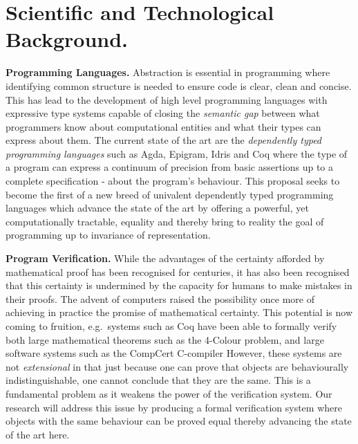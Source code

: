 \documentclass[a4paper,11pt]{article}
\newcommand{\eg}{{e.g.}\ }
\begin{document}

\vspace*{-0.1in} 
\section{Scientific and Technological Background.}
\vspace*{-0.1in} 

{\bf Programming Languages.} Abstraction is essential in programming
where identifying common structure is needed to ensure code is clear,
clean and concise. This has lead to the development of high level
programming languages with expressive type systems capable of closing
the {\em semantic gap} between what programmers know about
computational entities and what their types can express about them.
The current state of the art are the {\em dependently typed
  programming languages} such as Agda, Epigram, Idris and Coq where
the type of a program can express a
continuum of precision from basic assertions up to a complete
specification - about the program’s behaviour. This proposal seeks to
become the first of a new breed of univalent dependently typed
programming languages which advance the state of the art by offering a
powerful, yet computationally tractable, equality and thereby bring to
reality the goal of programming up to invariance of representation.


{\bf Program Verification.} While the advantages of the certainty
afforded by mathematical proof has been recognised for centuries, it
has also been recognised that this certainty is undermined by the
capacity for humans to make mistakes in their proofs. The advent of
computers raised the possibility once more of achieving in practice
the promise of mathematical certainty. This potential is now coming to
fruition, \eg systems such as Coq have been able to formally verify
both large mathematical theorems such as the 4-Colour problem, and
large software systems such as the CompCert C-compiler
However, these systems
are not {\em extensional} in that just because one can prove that
objects are behaviourally indistinguishable, one cannot conclude that
they are the same. This is a fundamental problem as it weakens the
power of the verification system. Our research will address this
issue by producing a formal verification system where objects with the
same behaviour can be proved equal thereby advancing the state of the
art here.
\end{document}

